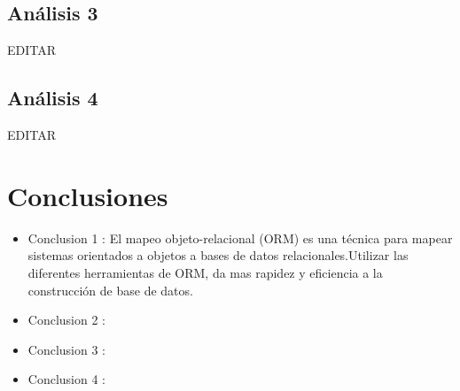 \documentclass[preprint,12pt]{elsarticle}
\begin{document}
\subsection{\textbf{Análisis 3}}
EDITAR\\

\subsection{\textbf{Análisis 4}}
EDITAR\\




\section{Conclusiones}

\begin{itemize}

\item Conclusion 1 :  El mapeo objeto-relacional (ORM) es una técnica para mapear sistemas orientados a objetos a bases
de datos relacionales.Utilizar las diferentes herramientas de ORM, da mas rapidez y eficiencia a la construcción de base
de datos.\\

\item Conclusion 2 : \\ 

\item Conclusion 3 : \\ 

\item Conclusion 4 : \\ 
\end{itemize}


	
	\newpage
	
		 
	
	
\end{document}
